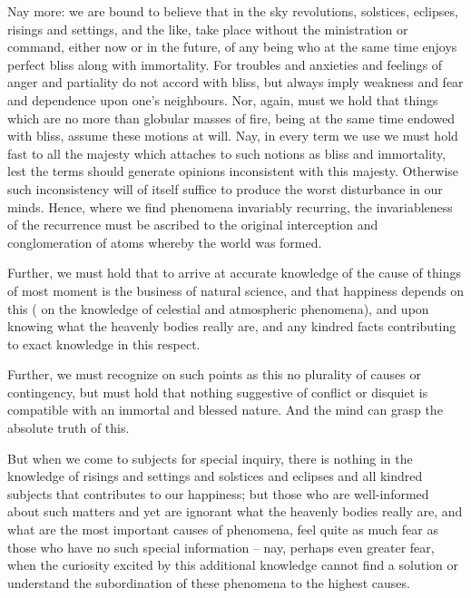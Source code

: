 \documentclass{stex}
\begin{document}
Nay more: we are bound to believe that in the sky revolutions, solstices, eclipses, risings and settings, and the like, take place without the ministration or command, either now or in the future, of any being who at the same time enjoys perfect bliss along with immortality.
For troubles and anxieties and feelings of anger and partiality do not accord with bliss, but always imply weakness and fear and dependence upon one's neighbours.
Nor, again, must we hold that things which are no more than globular masses of fire, being at the same time endowed with bliss, assume these motions at will.
Nay, in every term we use we must hold fast to all the majesty which attaches to such notions as bliss and immortality, lest the terms should generate opinions inconsistent with this majesty.
Otherwise such inconsistency will of itself suffice to produce the worst disturbance in our minds.
Hence, where we find phenomena invariably recurring, the invariableness of the recurrence must be ascribed to the original interception and conglomeration of atoms whereby the world was formed.

Further, we must hold that to arrive at accurate knowledge of the cause of things of most moment is the business of natural science, and that happiness depends on this (\videlicet{} on the knowledge of celestial and atmospheric phenomena), and upon knowing what the heavenly bodies really are, and any kindred facts contributing to exact knowledge in this respect.

Further, we must recognize on such points as this no plurality of causes or contingency, but must hold that nothing suggestive of conflict or disquiet is compatible with an immortal and blessed nature.
And the mind can grasp the absolute truth of this.

But when we come to subjects for special inquiry, there is nothing in the knowledge of risings and settings and solstices and eclipses and all kindred subjects that contributes to our happiness; but those who are well-informed about such matters and yet are ignorant what the heavenly bodies really are, and what are the most important causes of phenomena, feel quite as much fear as those who have no such special information – nay, perhaps even greater fear, when the curiosity excited by this additional knowledge cannot find a solution or understand the subordination of these phenomena to the highest causes.
\end{document}
